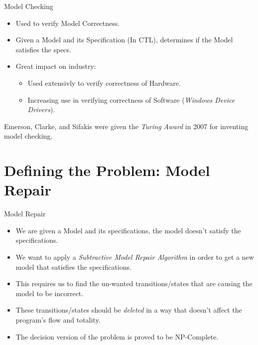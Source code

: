 \documentclass{bredelebeamer}
\begin{document}
\begin{frame}{Model Checking\citep{modelcheck}} %
\begin{itemize}
\item Used to verify Model Correctness.
\item Given a Model and its Specification (In CTL), determines if the Model satisfies the specs.
\item Great impact on industry:
\begin{itemize}
    \item Used extensivly to verify correctness of Hardware.
    \item Increasing use in verifying correctness of Software (\emph{Windows Device Drivers}).
\end{itemize}
\end{itemize}

\begin{block}{}
Emerson, Clarke, and Sifakis were given the \emph{Turing Award} in 2007 for inventing model checking.
\end{block}
\end{frame}

\section{Defining the Problem: Model Repair} %

\begin{frame}{Model Repair} 
\begin{itemize}
\item We are given a Model and its specifications, the model doesn't satisfy the specifications.
\item We want to apply a \emph{Subtractive Model Repair Algorithm} in order to get a new model that satisfies the specifications.
\item This requires us to find the un-wanted transitions/states that are causing the model to be incorrect.
\item These transitions/states should be \emph{deleted} in a way that doesn't affect the program's flow and totality.
\item The decision version of the problem is proved to be NP-Complete\citep{paper}.
\end{itemize}
\end{frame}
\end{document}
